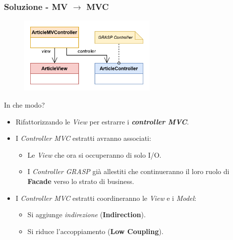 \begin{frame}
  \frametitle{Soluzione - MV $\to$ MVC}
  \begin{figure}
    \includegraphics[width=0.6\textwidth]{img/MVC.png}
  \end{figure}

  In che modo?
  \begin{itemize}
    \item Rifattorizzando le \emph{View} per estrarre i \textbf{\emph{controller MVC}}.
    \item I \emph{Controller MVC} estratti avranno associati:
    \begin{itemize}
      \item Le \emph{View} che ora si occuperanno di solo I/O.
      \item I \emph{Controller GRASP} già allestiti che continueranno
      il loro ruolo di \textbf{Facade} verso lo strato di business.
    \end{itemize}
    \item I \emph{Controller MVC} estratti coordineranno le \emph{View} e i \emph{Model}:
    \begin{itemize}
      \item Si aggiunge \emph{indirezione} (\textbf{Indirection}).
      \item Si riduce l'accoppiamento (\textbf{Low Coupling}).
    \end{itemize}
  \end{itemize}
\end{frame}

